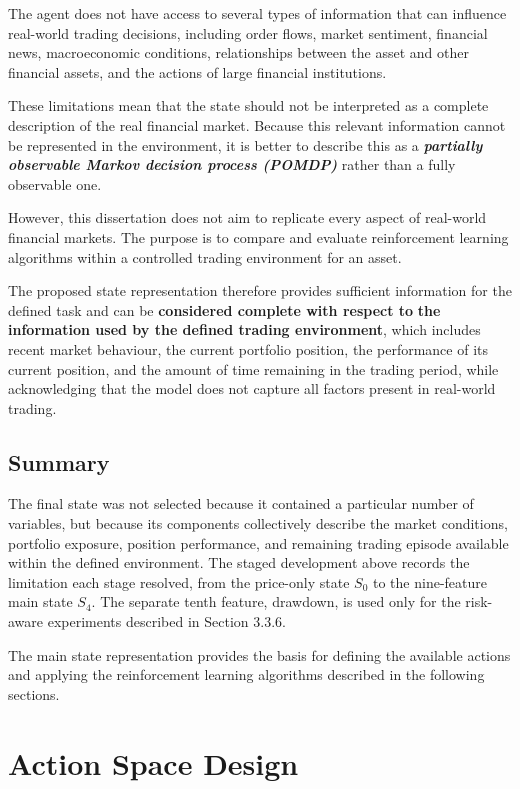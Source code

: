 The agent does not have access to several types of information that can
influence real-world trading decisions, including order flows, market
sentiment, financial news, macroeconomic conditions, relationships
between the asset and other financial assets, and the actions of large
financial institutions.

These limitations mean that the state should not be interpreted as a
complete description of the real financial market. Because this relevant
information cannot be represented in the environment, it is better to
describe this as a \emph{\textbf{partially observable Markov decision
process (POMDP)}} rather than a fully observable one.

However, this dissertation does not aim to replicate every aspect of
real-world financial markets. The purpose is to compare and evaluate
reinforcement learning algorithms within a controlled trading
environment for an asset.

The proposed state representation therefore provides sufficient
information for the defined task and can be \textbf{considered complete
with respect to} \textbf{the information used by the defined trading
environment}, which includes recent market behaviour, the current
portfolio position, the performance of its current position, and the
amount of time remaining in the trading period, while acknowledging that
the model does not capture all factors present in real-world trading.

\subsection{Summary}

The final state was not selected because it contained a particular
number of variables, but because its components collectively describe
the market conditions, portfolio exposure, position performance, and
remaining trading episode available within the defined environment. The
staged development above records the limitation each stage resolved,
from the price-only state \(S_{0}\) to the nine-feature main state
\(S_{4}\). The separate tenth feature, drawdown, is used only for the
risk-aware experiments described in Section 3.3.6.

The main state representation provides the basis for defining the
available actions and applying the reinforcement learning algorithms
described in the following sections.

\section{Action Space Design}

